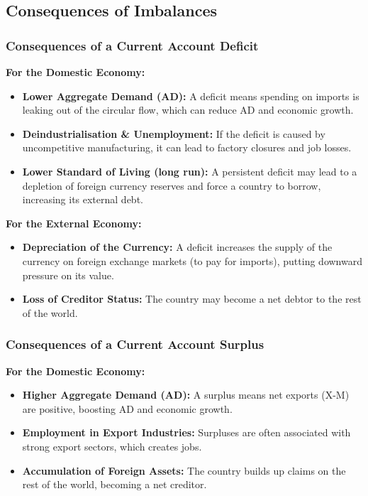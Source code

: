 \documentclass[11pt, a4paper, twoside]{book}
\begin{document}
\subsection{Consequences of Imbalances}

\subsubsection{Consequences of a Current Account Deficit}

\textbf{For the Domestic Economy:}
\begin{itemize}
  \item \textbf{Lower Aggregate Demand (AD):} A deficit means spending on imports is leaking out of the circular flow, which can reduce AD and economic growth.
  \item \textbf{Deindustrialisation \& Unemployment:} If the deficit is caused by uncompetitive manufacturing, it can lead to factory closures and job losses.
  \item \textbf{Lower Standard of Living (long run):} A persistent deficit may lead to a depletion of foreign currency reserves and force a country to borrow, increasing its external debt.
\end{itemize}

\textbf{For the External Economy:}
\begin{itemize}
  \item \textbf{Depreciation of the Currency:} A deficit increases the supply of the currency on foreign exchange markets (to pay for imports), putting downward pressure on its value.
  \item \textbf{Loss of Creditor Status:} The country may become a net debtor to the rest of the world.
\end{itemize}

\subsubsection{Consequences of a Current Account Surplus}

\textbf{For the Domestic Economy:}
\begin{itemize}
  \item \textbf{Higher Aggregate Demand (AD):} A surplus means net exports (X-M) are positive, boosting AD and economic growth.
  \item \textbf{Employment in Export Industries:} Surpluses are often associated with strong export sectors, which creates jobs.
  \item \textbf{Accumulation of Foreign Assets:} The country builds up claims on the rest of the world, becoming a net creditor.
\end{itemize}
\end{document}
